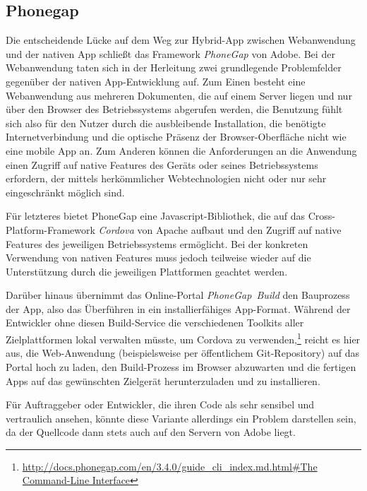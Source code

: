\documentclass{scrreprt}
\begin{document}
\subsection{Phonegap}
Die entscheidende Lücke auf dem Weg zur Hybrid-App zwischen Webanwendung und der nativen App schließt das Framework \emph{PhoneGap} von Adobe. 
Bei der Webanwendung taten sich in der Herleitung zwei grundlegende Problemfelder gegenüber der nativen App-Entwicklung auf. 
Zum Einen besteht eine Webanwendung aus mehreren Dokumenten, die auf einem Server liegen und nur über den Browser des Betriebssystems abgerufen werden, die Benutzung fühlt sich also für den Nutzer durch die ausbleibende Installation, die benötigte Internetverbindung und die optische Präsenz der Browser-Oberfläche nicht wie eine mobile App an. 
Zum Anderen können die Anforderungen an die Anwendung einen Zugriff auf native Features des Geräts oder seines Betriebssystems erfordern, der mittels herkömmlicher Webtechnologien nicht oder nur sehr eingeschränkt möglich sind. 

Für letzteres bietet PhoneGap eine Javascript-Bibliothek, die auf das Cross-Platform-Framework \emph{Cordova} von Apache aufbaut und den Zugriff auf native Features des jeweiligen Betriebssystems ermöglicht.
Bei der konkreten Verwendung von nativen Features muss jedoch teilweise wieder auf die Unterstützung durch die jeweiligen Plattformen geachtet werden.

Darüber hinaus übernimmt das Online-Portal \emph{PhoneGap~Build} den Bauprozess der App, also das Überführen in ein installierfähiges App-Format. 
Während der Entwickler ohne diesen Build-Service die verschiedenen Toolkits aller Zielplattformen lokal verwalten müsste, um Cordova zu verwenden,\footnote{\url{http://docs.phonegap.com/en/3.4.0/guide_cli_index.md.html#The Command-Line Interface}} reicht es hier aus, die Web-Anwendung (beispielsweise per öffentlichem Git-Repository) auf das Portal hoch zu laden, den Build-Prozess im Browser abzuwarten und die fertigen Apps auf das gewünschten Zielgerät herunterzuladen und zu installieren. 

Für Auftraggeber oder Entwickler, die ihren Code als sehr sensibel und vertraulich ansehen, könnte diese Variante allerdings ein Problem darstellen sein, da der Quellcode dann stets auch auf den Servern von Adobe liegt.
\end{document}
